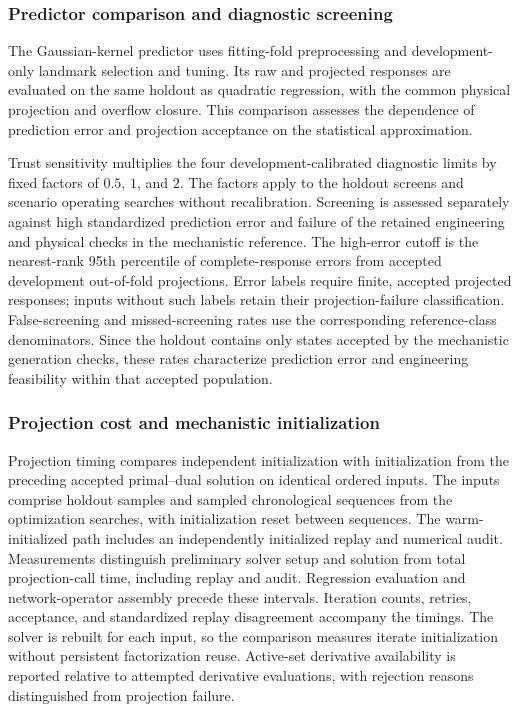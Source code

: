 \documentclass[a4paper,fleqn]{cas-sc}
\begin{document}
\subsubsection{Predictor comparison and diagnostic screening}

The Gaussian-kernel predictor uses fitting-fold preprocessing and development-only landmark selection and tuning. Its raw and projected responses are evaluated on the same holdout as quadratic regression, with the common physical projection and overflow closure. This comparison assesses the dependence of prediction error and projection acceptance on the statistical approximation.

Trust sensitivity multiplies the four development-calibrated diagnostic limits by fixed factors of $0.5$, $1$, and $2$. The factors apply to the holdout screens and scenario operating searches without recalibration. Screening is assessed separately against high standardized prediction error and failure of the retained engineering and physical checks in the mechanistic reference. The high-error cutoff is the nearest-rank 95th percentile of complete-response errors from accepted development out-of-fold projections. Error labels require finite, accepted projected responses; inputs without such labels retain their projection-failure classification. False-screening and missed-screening rates use the corresponding reference-class denominators. Since the holdout contains only states accepted by the mechanistic generation checks, these rates characterize prediction error and engineering feasibility within that accepted population.

\subsubsection{Projection cost and mechanistic initialization}

Projection timing compares independent initialization with initialization from the preceding accepted primal--dual solution on identical ordered inputs. The inputs comprise holdout samples and sampled chronological sequences from the optimization searches, with initialization reset between sequences. The warm-initialized path includes an independently initialized replay and numerical audit. Measurements distinguish preliminary solver setup and solution from total projection-call time, including replay and audit. Regression evaluation and network-operator assembly precede these intervals. Iteration counts, retries, acceptance, and standardized replay disagreement accompany the timings. The solver is rebuilt for each input, so the comparison measures iterate initialization without persistent factorization reuse. Active-set derivative availability is reported relative to attempted derivative evaluations, with rejection reasons distinguished from projection failure.
\end{document}
